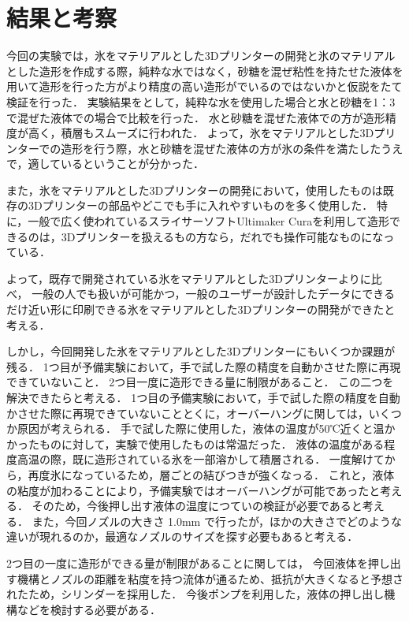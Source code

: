 \chapter{結果と考察}
\label{chp:first}

今回の実験では，氷をマテリアルとした3Dプリンターの開発と氷のマテリアルとした造形を作成する際，純粋な水ではなく，砂糖を混ぜ粘性を持たせた液体を用いて造形を行った方がより精度の高い造形がでいるのではないかと仮説をたて検証を行った．
実験結果をとして，純粋な水を使用した場合と水と砂糖を1：3で混ぜた液体での場合で比較を行った．
水と砂糖を混ぜた液体での方が造形精度が高く，積層もスムーズに行われた．
よって，氷をマテリアルとした3Dプリンターでの造形を行う際，水と砂糖を混ぜた液体の方が氷の条件を満たしたうえで，適しているということが分かった．

また，氷をマテリアルとした3Dプリンターの開発において，使用したものは既存の3Dプリンターの部品やどこでも手に入れやすいものを多く使用した．
特に，一般で広く使われているスライサーソフトUltimaker Curaを利用して造形できるのは，3Dプリンターを扱えるもの方なら，だれでも操作可能なものになっている．

よって，既存で開発されている氷をマテリアルとした3Dプリンターよりに比べ，
一般の人でも扱いが可能かつ，一般のユーザーが設計したデータにできるだけ近い形に印刷できる氷をマテリアルとした3Dプリンターの開発ができたと考える．

しかし，今回開発した氷をマテリアルとした3Dプリンターにもいくつか課題が残る．
1つ目が予備実験において，手で試した際の精度を自動かさせた際に再現できていないこと．
2つ目一度に造形できる量に制限があること．
この二つを解決できたらと考える．
1つ目の予備実験において，手で試した際の精度を自動かさせた際に再現できていないこととくに，オーバーハングに関しては，いくつか原因が考えられる．
手で試した際に使用した，液体の温度が50℃近くと温かかったものに対して，実験で使用したものは常温だった．
液体の温度がある程度高温の際，既に造形されている氷を一部溶かして積層される．
一度解けてから，再度氷になっているため，層ごとの結びつきが強くなっる．
これと，液体の粘度が加わることにより，予備実験ではオーバーハングが可能であったと考える．
そのため，今後押し出す液体の温度につていの検証が必要であると考える．
また，今回ノズルの大きさ 1.0mm で行ったが，ほかの大きさでどのような違いが現れるのか，最適なノズルのサイズを探す必要もあると考える．

2つ目の一度に造形ができる量が制限があることに関しては，
今回液体を押し出す機構とノズルの距離を粘度を持つ流体が通るため、抵抗が大きくなると予想されたため，シリンダーを採用した．
今後ポンプを利用した，液体の押し出し機構などを検討する必要がある．


